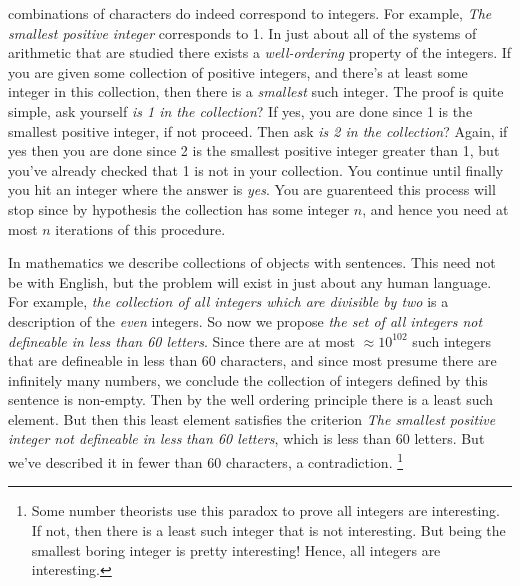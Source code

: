         combinations of characters do indeed correspond to integers. For
        example, \textit{The smallest positive integer} corresponds to 1. In
        just about all of the systems of arithmetic that are studied there
        exists a \textit{well-ordering} property of the
        integers. If you are given some collection of positive integers, and
        there's at least some integer in this collection, then there is a
        \textit{smallest} such integer. The proof is quite simple, ask yourself
        \textit{is 1 in the collection}? If yes, you are done since 1 is the
        smallest positive integer, if not proceed. Then ask
        \textit{is 2 in the collection}? Again, if yes then you are done since
        2 is the smallest positive integer greater than 1, but you've already
        checked that 1 is not in your collection. You continue until finally you
        hit an integer where the answer is \textit{yes}. You are guarenteed this
        process will stop since by hypothesis the collection has some integer
        $n$, and hence you need at most $n$ iterations of this procedure.
        \par\hfill\par
        In mathematics we describe collections of objects with sentences. This
        need not be with English, but the problem will exist in just about any
        human language. For example,
        \textit{the collection of all integers which are divisible by two} is a
        description of the \textit{even} integers. So now we propose
        \textit{the set of all integers not defineable in less than 60 letters}.
        Since there are at most $\approx{10}^{102}$ such integers that are
        defineable in less than 60 characters, and since most presume there are
        infinitely many numbers, we conclude the collection of integers defined
        by this sentence is non-empty. Then by the well ordering principle there
        is a least such element. But then this least element satisfies the
        criterion \textit{The smallest positive integer not defineable in less}
        \textit{than 60 letters}, which is less than 60 letters. But we've
        described it in fewer than 60 characters, a contradiction.%
        \footnote{%
            Some number theorists use this paradox to prove all integers are
            interesting. If not, then there is a least such integer that is
            not interesting. But being the smallest boring integer is pretty
            interesting! Hence, all integers are interesting.%
        }
